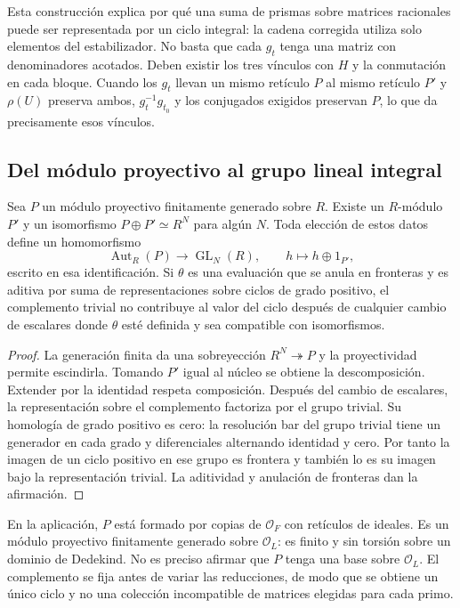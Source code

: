 Esta construcción explica por qué una suma de prismas sobre matrices racionales puede ser representada por un ciclo integral: la cadena corregida utiliza solo elementos del estabilizador. No basta que cada $g_t$ tenga una matriz con denominadores acotados. Deben existir los tres vínculos con $H$ y la conmutación en cada bloque. Cuando los $g_t$ llevan un mismo retículo $P$ al mismo retículo $P'$ y $\rho(U)$ preserva ambos, $g_t^{-1}g_{t_0}$ y los conjugados exigidos preservan $P$, lo que da precisamente esos vínculos.

\subsection{Del módulo proyectivo al grupo lineal integral}

\begin{proposicion}
\label{prop:rh-complemento}
Sea $P$ un módulo proyectivo finitamente generado sobre $R$. Existe un $R$-módulo $P'$ y un isomorfismo $P\oplus P'\simeq R^N$ para algún $N$. Toda elección de estos datos define un homomorfismo
\begin{equation}
 \operatorname{Aut}_R(P)\longrightarrow\operatorname{GL}_N(R),
 \qquad h\longmapsto h\oplus 1_{P'},
 \label{eq:rh-complemento}
\end{equation}
 escrito en esa identificación. Si $\theta$ es una evaluación que se anula en fronteras y es aditiva por suma de representaciones sobre ciclos de grado positivo, el complemento trivial no contribuye al valor del ciclo después de cualquier cambio de escalares donde $\theta$ esté definida y sea compatible con isomorfismos.
\end{proposicion}
\begin{proof}
La generación finita da una sobreyección $R^N\twoheadrightarrow P$ y la proyectividad permite escindirla. Tomando $P'$ igual al núcleo se obtiene la descomposición. Extender por la identidad respeta composición. Después del cambio de escalares, la representación sobre el complemento factoriza por el grupo trivial. Su homología de grado positivo es cero: la resolución bar del grupo trivial tiene un generador en cada grado y diferenciales alternando identidad y cero. Por tanto la imagen de un ciclo positivo en ese grupo es frontera y también lo es su imagen bajo la representación trivial. La aditividad y anulación de fronteras dan la afirmación.
\end{proof}

En la aplicación, $P$ está formado por copias de $\mathcal O_F$ con retículos de ideales. Es un módulo proyectivo finitamente generado sobre $\mathcal O_L$: es finito y sin torsión sobre un dominio de Dedekind. No es preciso afirmar que $P$ tenga una base sobre $\mathcal O_L$. El complemento se fija antes de variar las reducciones, de modo que se obtiene un único ciclo y no una colección incompatible de matrices elegidas para cada primo.

